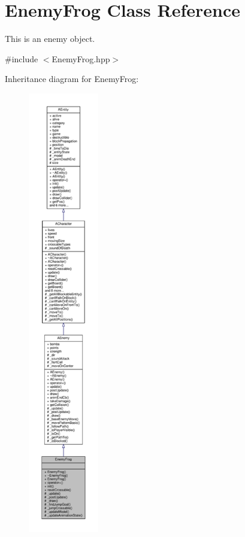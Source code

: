 \hypertarget{class_enemy_frog}{}\section{Enemy\+Frog Class Reference}
\label{class_enemy_frog}


This is an enemy object.  




{\ttfamily \#include $<$Enemy\+Frog.\+hpp$>$}



Inheritance diagram for Enemy\+Frog\+:
\nopagebreak
\begin{figure}[H]
\begin{center}
\leavevmode
\includegraphics[height=550pt]{class_enemy_frog__inherit__graph}
\end{center}
\end{figure}


